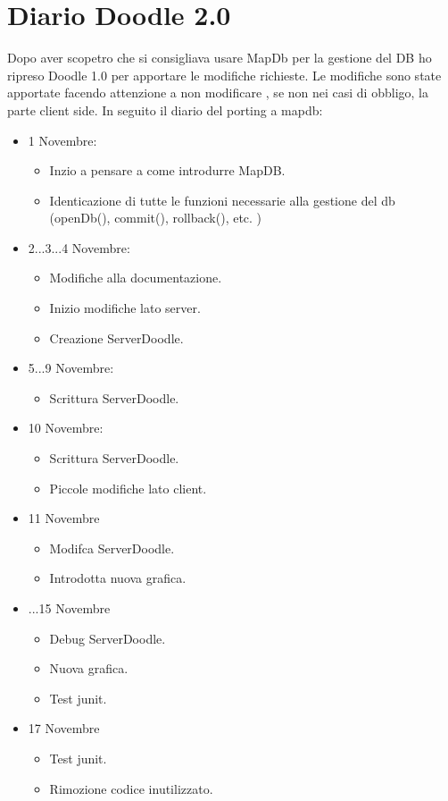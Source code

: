 \section{Diario Doodle 2.0}
Dopo aver scopetro che si consigliava usare MapDb per la gestione del DB ho ripreso Doodle 1.0 per apportare le modifiche richieste. Le modifiche sono state apportate facendo attenzione a non modificare , se non nei casi di obbligo, la parte client side. In seguito il diario del porting a mapdb:\\
\begin{itemize}
	\item 1 Novembre: 	
	\begin{itemize}
		\item Inzio a pensare a come introdurre MapDB.
		\item Identicazione di tutte le funzioni necessarie alla gestione del db (openDb(), commit(), rollback(), etc.  )
	\end{itemize}
	
	\item 2...3...4 Novembre: 	
	\begin{itemize}
		\item Modifiche alla documentazione.
		\item Inizio modifiche lato server.
		\item Creazione ServerDoodle.
	\end{itemize}
	\item 5...9 Novembre: 	
	\begin{itemize}
		\item Scrittura ServerDoodle.
	\end{itemize}
	
	\item 10 Novembre: 	
	\begin{itemize}
		\item Scrittura ServerDoodle.
		\item Piccole modifiche lato client.
	\end{itemize}
	
	\item 11 Novembre
	\begin{itemize}
		\item Modifca ServerDoodle.
		\item Introdotta nuova grafica.
	\end{itemize}
	
		\item ...15 Novembre
		\begin{itemize}
			\item Debug ServerDoodle.
			\item Nuova grafica.
			\item Test junit.
		\end{itemize}
		
		\item 17 Novembre
		\begin{itemize}
			\item Test junit.
			\item Rimozione codice inutilizzato.
		\end{itemize}
		
	\end{itemize}
	
